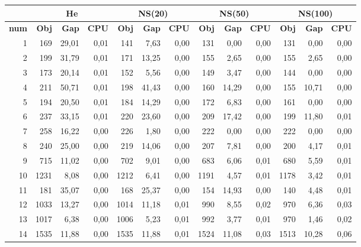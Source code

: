 \begin{table}[H]
	\centering
	\small
	\begin{tabular}{|r|rrr|rrr|rrr|rrr|}
		\toprule
		\hline
		\rowcolor{cyan}	& \multicolumn{3}{c|}{\textbf{He}}&\multicolumn{3}{c|}{\textbf{NS(20)}}&\multicolumn{3}{c|}{\textbf{NS(50)}}&\multicolumn{3}{c|}{\textbf{NS(100)}} \\ \hline
		\midrule
		\rowcolor{cyan}	\textbf{num} & \textbf{Obj}& \textbf{Gap}  & \textbf{CPU} & \textbf{Obj}& \textbf{Gap}  & \textbf{CPU} & \textbf{Obj}& \textbf{Gap}  & \textbf{CPU} & \textbf{Obj}&\textbf{Gap}  & \textbf{CPU} \\ \hline
		\midrule
1	&	169	&	29,01	&	0,01	&	141	&	7,63	&	0,00	&	131	&	0,00	&	0,00	&	131	&	0,00	&	0,00	\\ \hline
2	&	199	&	31,79	&	0,01	&	171	&	13,25	&	0,00	&	155	&	2,65	&	0,00	&	155	&	2,65	&	0,00	\\ \hline
3	&	173	&	20,14	&	0,01	&	152	&	5,56	&	0,00	&	149	&	3,47	&	0,00	&	144	&	0,00	&	0,00	\\ \hline
4	&	211	&	50,71	&	0,01	&	198	&	41,43	&	0,00	&	160	&	14,29	&	0,00	&	155	&	10,71	&	0,00	\\ \hline
5	&	194	&	20,50	&	0,01	&	184	&	14,29	&	0,00	&	172	&	6,83	&	0,00	&	161	&	0,00	&	0,00	\\ \hline
6	&	237	&	33,15	&	0,01	&	220	&	23,60	&	0,00	&	209	&	17,42	&	0,00	&	199	&	11,80	&	0,01	\\ \hline
7	&	258	&	16,22	&	0,00	&	226	&	1,80	&	0,00	&	222	&	0,00	&	0,00	&	222	&	0,00	&	0,00	\\ \hline
8	&	240	&	25,00	&	0,00	&	219	&	14,06	&	0,00	&	207	&	7,81	&	0,00	&	200	&	4,17	&	0,01	\\ \hline
9	&	715	&	11,02	&	0,00	&	702	&	9,01	&	0,00	&	683	&	6,06	&	0,01	&	680	&	5,59	&	0,01	\\ \hline
10	&	1231	&	8,08	&	0,00	&	1212	&	6,41	&	0,00	&	1191	&	4,57	&	0,01	&	1178	&	3,42	&	0,01	\\ \hline
11	&	181	&	35,07	&	0,00	&	168	&	25,37	&	0,00	&	154	&	14,93	&	0,00	&	140	&	4,48	&	0,01	\\ \hline
12	&	1033	&	13,27	&	0,00	&	1014	&	11,18	&	0,01	&	990	&	8,55	&	0,02	&	970	&	6,36	&	0,03	\\ \hline
13	&	1017	&	6,38	&	0,00	&	1006	&	5,23	&	0,01	&	992	&	3,77	&	0,01	&	970	&	1,46	&	0,02	\\ \hline
14	&	1535	&	11,88	&	0,00	&	1535	&	11,88	&	0,01	&	1524	&	11,08	&	0,03	&	1513	&	10,28	&	0,06	\\ \hline

\end{tabular}
\end{table}
